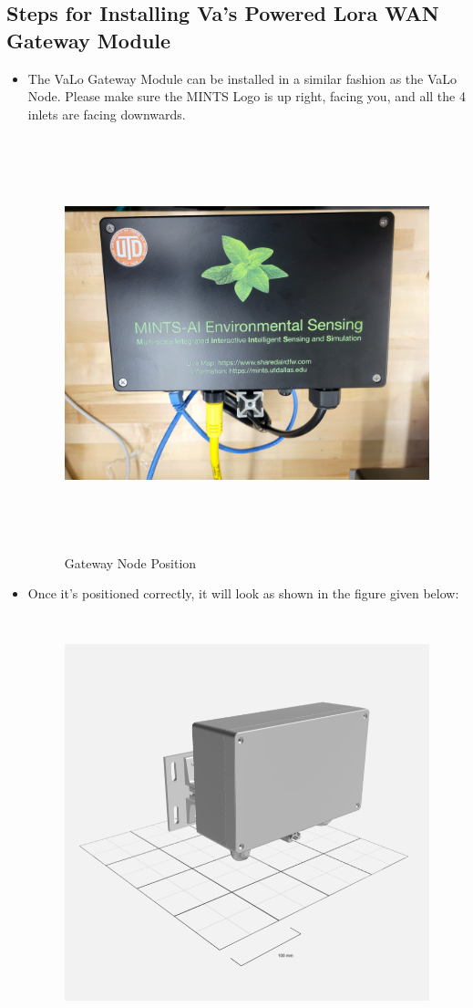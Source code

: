 \documentclass[12pt]{article}
\begin{document}
\subsection{Steps for Installing Va's Powered Lora WAN Gateway Module}
\begin{itemize}
    \item The VaLo Gateway Module can be installed in a similar fashion as the VaLo Node. Please make sure the MINTS Logo is up right, facing you, and all the 4 inlets are facing downwards.
    \begin{figure}[H]
         \centering
        \includegraphics[width=12cm,height=12cm,angle=180]{figures/gateway.jpg}
         \centering
        \caption{Gateway Node Position}\label{Fig:Gateway Node Position}
    \end{figure}
    \item Once it's positioned correctly, it will look as shown in the figure given below:
     \begin{figure}[H]
         \centering
         \includegraphics[width=12cm,height=12cm,]{figures/gateway_1.png}

\end{figure}
\end{itemize}
\end{document}
